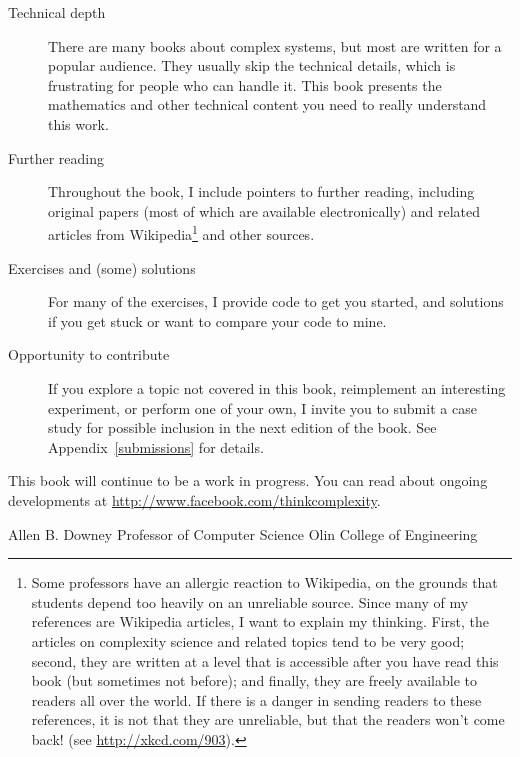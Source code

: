 \documentclass[10pt]{book}
\begin{document}
\begin{description}

\item[Technical depth] There are many books about complex systems,
  but most are written for a popular audience.  They usually skip the
  technical details, which is frustrating for people who can handle
  it.  This book presents the mathematics and other technical content
  you need to really understand this work.

\item[Further reading] Throughout the book, I include pointers to
  further reading, including original papers (most of which are
  available electronically) and related articles from
  Wikipedia\footnote{Some professors have an allergic reaction to
    Wikipedia, on the grounds that students depend too heavily on an
    unreliable source.  Since many of my references are Wikipedia
    articles, I want to explain my thinking.  First, the articles on
    complexity science and related topics tend to be very good;
    second, they are written at a level that is accessible after you
    have read this book (but sometimes not before); and finally, they
    are freely available to readers all over the world.  If there is a
    danger in sending readers to these references, it is not that they
    are unreliable, but that the readers won't come back!  (see
    \url{http://xkcd.com/903}).} and other sources.

\item[Exercises and (some) solutions] For many of the exercises, I
  provide code to get you started, and solutions if you get stuck or
  want to compare your code to mine.

\item[Opportunity to contribute] If you explore a topic not covered in
  this book, reimplement an interesting experiment, or perform one of
  your own, I invite you to submit a case study for possible inclusion
  in the next edition of the book.  See Appendix~\ref{submissions} for
  details.

\end{description}

This book will continue to be a work in progress.  You can read
about ongoing developments at \url{http://www.facebook.com/thinkcomplexity}.

Allen B. Downey \newline
Professor of Computer Science \newline
Olin College of Engineering
\end{document}
